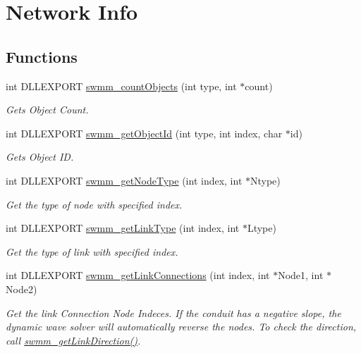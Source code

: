 \hypertarget{group___network_info}{}\section{Network Info}
\label{group___network_info}
\subsection*{Functions}
\begin{DoxyCompactItemize}
\item 
int D\+L\+L\+E\+X\+P\+O\+RT \mbox{\hyperlink{group___network_info_gae1abeab9f6ff81750c80460e48f5dd20}{swmm\+\_\+count\+Objects}} (int type, int $\ast$count)
\begin{DoxyCompactList}\small\item\em Gets Object Count. \end{DoxyCompactList}\item 
int D\+L\+L\+E\+X\+P\+O\+RT \mbox{\hyperlink{group___network_info_ga8bad91e436bc64458cf0958b722781a0}{swmm\+\_\+get\+Object\+Id}} (int type, int index, char $\ast$id)
\begin{DoxyCompactList}\small\item\em Gets Object ID. \end{DoxyCompactList}\item 
int D\+L\+L\+E\+X\+P\+O\+RT \mbox{\hyperlink{group___network_info_gae66a64aee207928c902cb399222cf418}{swmm\+\_\+get\+Node\+Type}} (int index, int $\ast$Ntype)
\begin{DoxyCompactList}\small\item\em Get the type of node with specified index. \end{DoxyCompactList}\item 
int D\+L\+L\+E\+X\+P\+O\+RT \mbox{\hyperlink{group___network_info_gacf4d0ca8a3ced3c1b8797f3f09fff1d0}{swmm\+\_\+get\+Link\+Type}} (int index, int $\ast$Ltype)
\begin{DoxyCompactList}\small\item\em Get the type of link with specified index. \end{DoxyCompactList}\item 
int D\+L\+L\+E\+X\+P\+O\+RT \mbox{\hyperlink{group___network_info_gaebf8dfaeb171add70860fbdd99f768be}{swmm\+\_\+get\+Link\+Connections}} (int index, int $\ast$Node1, int $\ast$Node2)
\begin{DoxyCompactList}\small\item\em Get the link Connection Node Indeces. If the conduit has a negative slope, the dynamic wave solver will automatically reverse the nodes. To check the direction, call \mbox{\hyperlink{group___network_info_gac390c83be7f7f0e2cd9c6f1126a226aa}{swmm\+\_\+get\+Link\+Direction()}}. \end{DoxyCompactList}\item 

\end{DoxyCompactItemize}

